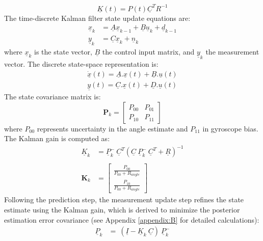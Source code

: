 \begin{equation} \underline{K}(t) = P(t) \underline{C}^T R^{-1} \end{equation}
The time-discrete Kalman filter state update equations are:
\begin{equation}
	\begin{aligned}
		\underline{x}_{k} &= \underline{A} \underline{x}_{k-1} + \underline{B} \underline{u}_{k} + \underline{d}_{k-1} \\
		\underline{y}_{k} &= \underline{C} \underline{x}_{k} + \underline{n}_{k}  \label{eq:eq}
	\end{aligned}
\end{equation}
where $\underline{x}_k$ is the state vector, $\underline{B}$ the control input matrix, and $\underline{y}_k$ the measurement vector. The discrete state-space representation is:
\begin{equation}
	\begin{aligned}
		\underline{\dot{x}}(t) = \underline{A}.\underline{x}(t) + \underline{B}.\underline{u}(t) \\
		\underline{y}(t) = \underline{C}.\underline{x}(t) + \underline{D}.\underline{u}(t)  \label{eq:eq}
	\end{aligned}
\end{equation}
The state covariance matrix is:
\begin{equation}
	\mathbf{P}_k = \begin{bmatrix} P_{00} & P_{01} \\ P_{10} & P_{11} \end{bmatrix}  \label{eq:eq}
\end{equation}
where $P_{00}$ represents uncertainty in the angle estimate and $P_{11}$ in gyroscope bias. The Kalman gain is computed as:
\begin{equation}
	\begin{aligned}
		\underline{K}_{k} &= \underline{P}_{k}^- \ \underline{C}^T ( \underline{C} \ \underline{P}_{k}^-\ \underline{C}^T  +\underline{R})^{-1} \\ \\
		\mathbf{K}_k &= \begin{bmatrix} \frac{ P_{00} }{ P_{00}  
				+ R_{angle}} \\ \frac{ P_{10} }{ P_{00}  
				+ R_{angle}} \end{bmatrix}
	\end{aligned}  \label{eq:eq}
\end{equation}
Following the prediction step, the measurement update step refines the state estimate using the Kalman gain, which is derived to minimize the posterior estimation error covariance (see Appendix \ref{appendix:B} for detailed calculations):
\begin{equation}
	\begin{aligned}
		\underline{P}_{k} &= \ (\underline{I} - \underline{K}_{k} \ \underline{C}) \ \underline{P}_{k}^- \label{eq:eq}
	\end{aligned}
\end{equation}


